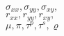 \documentclass[12pt]{article}
\begin{document}
\noindent 
{\bf 
$\sigma_{xx}, \sigma_{yy}, \sigma_{xy},$\\
$ r_{xx}, r_{yy}, r_{xy},$\\
$ \mu, \pi, \tau^p, \tau^s, \varrho$
}
\end{document}
